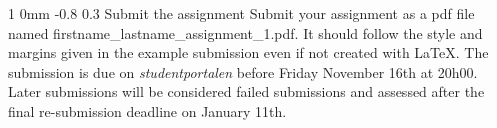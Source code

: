 \documentclass[11pt]{article}
\makeatletter
\renewcommand{\section}{\@startsection
{section}%
{1}%
{0mm}%
{-0.8\baselineskip}%
{0.3\baselineskip}%
{\bfseries\large}}%
\makeatother
\begin{document}
\section{Submit the assignment}
\noindent
Submit your assignment as a pdf file named
firstname\_lastname\_assignment\_1.pdf. It should follow the style and
margins given in the example submission even if not created with
LaTeX. The submission is due on \textit{studentportalen} before Friday
November 16th at 20h00. Later submissions will be considered failed
submissions and assessed after the final re-submission deadline on
January 11th.
\end{document}
